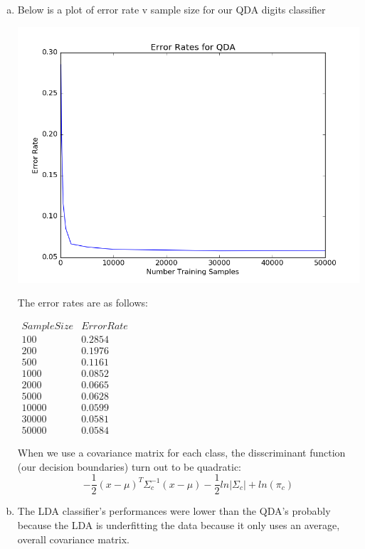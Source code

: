 \documentclass{article}
\begin{document}
\begin{enumerate}[a)]
  \item Below is a plot of error rate v sample size for our QDA digits classifier
    \begin{center}
      \includegraphics[scale=0.5]{prob5dii}
    \end{center}
    The error rates are as follows:
    \begin{center}
      $\begin{array}{c|c}
        Sample Size & Error Rate \\ \hline
        100 & 0.2854\\
        200 & 0.1976 \\
        500 & 0.1161 \\
        1000 & 0.0852 \\
        2000 & 0.0665\\
        5000 & 0.0628\\
        10000 & 0.0599\\
        30000 & 0.0581\\
        50000 & 0.0584
      \end{array}$
    \end{center}
    When we use a covariance matrix for each class, the disscriminant function (our decision boundaries) turn out to be quadratic:
    $$-\frac{1}{2}(x-\mu)^T \Sigma_c^{-1}(x-\mu) - \frac{1}{2}ln|\Sigma_c| + ln(\pi_c)$$

  \item The LDA classifier's performances were lower than the QDA's probably because the LDA is underfitting the data because it only uses an average, overall covariance matrix.


\end{enumerate}
\end{document}
